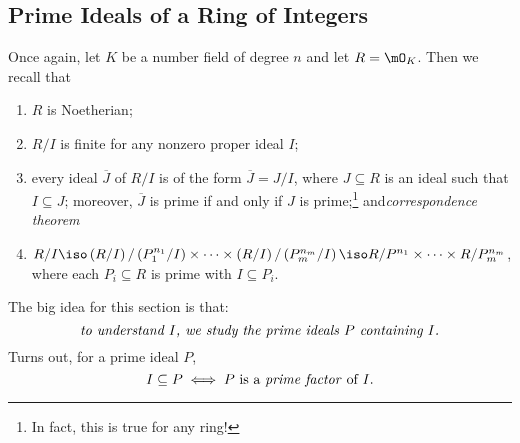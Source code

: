 \documentclass[pmath441]{subfiles}
\begin{document}
    \subsection{Prime Ideals of a Ring of Integers}

    Once again, let $K$ be a number field of degree $n$ and let $R = \mO_K$. Then we recall that
    \begin{enumerate}
        \item $R$ is Noetherian; 
        \item $R /I$ is finite for any nonzero proper ideal $I$;
        \item every ideal $\overline{J}$ of $R /I$ is of the form $\overline{J} = J /I$, where $J\subseteq R$ is an ideal such that $I\subseteq J$; moreover, $\overline{J}$ is prime if and only if $J$ is prime;\footnote{In fact, this is true for any ring!} and\hfill\textit{correspondence theorem}
        \item $R /I \iso \left( R /I \right) / \left( P_1^{n_1} / I \right) \times \cdots \times \left( R /I \right) / \left( P_m^{n_m} / I \right) \iso R /P^{n_1}\times\cdots\times R /P_m^{n_m}$, where each $P_i\subseteq R$ is prime with $I\subseteq P_i$.
    \end{enumerate}
    The big idea for this section is that:
    \begin{equation*}
        \text{\textit{to understand $I$, we study the prime ideals $P$ containing $I$.}}
    \end{equation*}
    Turns out, for a prime ideal $P$,
    \begin{equation*}
        I\subseteq P \iff P\text{ is a \textit{prime factor} of $I$}.
    \end{equation*}
    

    
    
    
    
    
    
    
    
    
    
    
    
    
    
    
    
    
    
    
    
    
    
    
    
    
    
    
    
    
    
    
    
    
    
    
    
    
    
\end{document}
